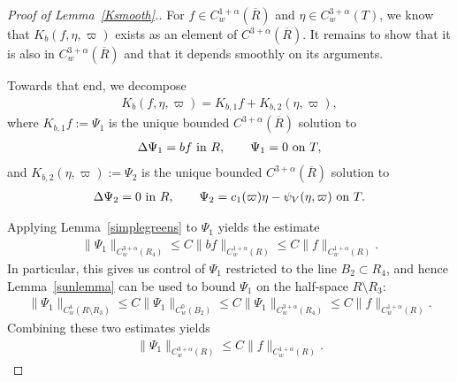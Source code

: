 \documentclass[11pt,reqno]{amsart}
\newcommand{\n}[2][]{#1\lVert #2 #1\rVert}
\theoremstyle{plain}
\theoremstyle{remark}
\numberwithin{equation}{section}
\begin{document}
\begin{proof}[Proof of Lemma~\ref{Ksmooth}.]
  For $f \in C^{1+\alpha}_w(\overline R)$ and $\eta \in C^{3+\alpha}_w(T)$, we know that $K_b(f,\eta,\varpi)$ exists as an element of $C^{3+\alpha}(\overline R)$. It remains to show that it is also in $C^{3+\alpha}_w(\overline R)$ and that it depends smoothly on its arguments. 
  
  Towards that end, we decompose 
  \begin{align*}
    K_b(f,\eta,\varpi) = K_{b,1} f  + K_{b,2}(\eta,\varpi),
  \end{align*}
  where $K_{b,1} f := \Psi_1$ is the unique bounded $C^{3+\alpha}(\overline R)$ solution to 
  \begin{align*}
    \Delta \Psi_1 = bf \textup{~in~} R,
    \qquad \Psi_1 = 0 \textup{~on~} T,
  \end{align*}
  and $K_{b,2}(\eta,\varpi) := \Psi_2$  is the unique
  bounded $C^{3+\alpha}(\overline R)$ solution to
  \begin{align*}
    \Delta \Psi_2  = 0 \textup{~in~} R,
    \qquad \Psi_2 = c_1(\varpi)\eta - \psi_V(\eta,\varpi) \textup{~on~} T.
  \end{align*}

  Applying Lemma~\ref{simplegreens} to $\Psi_1$ yields the estimate
  \begin{align*}
    \| \Psi_1 \|_{C^{3+\alpha}_w(R_4)} 
    \le C \n{bf}_{C^{1+\alpha}_w(R)}
    \le C \n{f}_{C^{1+\alpha}_w(R)}.
  \end{align*}
  In particular, this gives us control of $\Psi_1$ restricted to the line $B_2 \subset R_4$, and hence Lemma~\ref{sunlemma} can be used to bound $\Psi_1$ on the half-space $R\setminus R_3$:
  \begin{align*}
    \n{\Psi_1}_{C^4_w(R \setminus R_3)}
    \le C\n{\Psi_1}_{C^0_w(B_2)}
    \le C\n{\Psi_1}_{C^{3+\alpha}_w(R_4)}
    \le C\n f_{C^{1+\alpha}_w(R)}.
  \end{align*}
  Combining these two estimates yields
  \begin{align*}
    \n{\Psi_1}_{C^{3+\alpha}_w(R)} \le C \n f_{C^{1+\alpha}_w(R)}. 
  \end{align*}


\end{proof}
\end{document}
